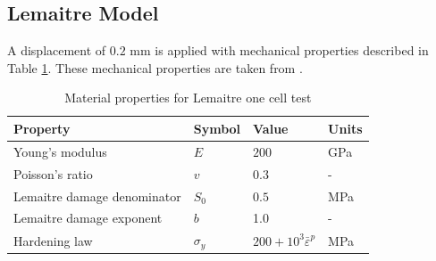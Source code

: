 \documentclass[sn-mathphys,Numbered]{sn-jnl}%
\begin{document}
\begin{appendices}


\subsection{Lemaitre Model}
A displacement of $0.2$ mm is applied with mechanical properties described in Table \ref{tab:material_properties_one_elem_lemaitre}.
These mechanical properties are taken from \citet{autay_numerical_2018}.
\begin{table}[htb]
	\centering
		\begin{tabular}{llll} \hline
			Property & Symbol & Value & Units  \\ \hline 
			Young's modulus & $E$ & $200$ & GPa \\
			Poisson's ratio & $v$ & $0.3$ & -  \\
			Lemaitre damage denominator & $S_0$ & $0.5$ &  MPa  \\
			Lemaitre damage exponent & $b$ & 1.0 & - \\
			Hardening law & $\sigma_y$ & $200+10^3{\bar{\varepsilon}}^p$ &  MPa  \\
			\hline
		\end{tabular}
	\caption{Material properties for Lemaitre one cell test}
	\label{tab:material_properties_one_elem_lemaitre}
\end{table}


\end{appendices}
\end{document}
